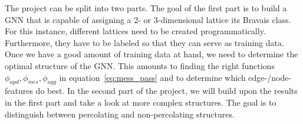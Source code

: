 The project can be split into two parts. The goal of the first part is to build a GNN that is capable of assigning a 2- or 3-dimensional lattice its Bravais class. 
For this instance, different lattices need to be created programmatically. Furthermore, they have to be labeled so that they can serve as training data.
Once we have a good amount of training data at hand, we need to determine the optimal structure of the GNN. This amounts to finding the
right functions $\phi_{upd},\phi_{mes},\phi_{agg}$ in equation~\ref{eq:mess_pass} and to determine which edge-/node-features do best.
In the second part of the project, we will build upon the results in the first part and take a look at more complex structures. The goal is to distinguish between percolating and non-percolating structures.